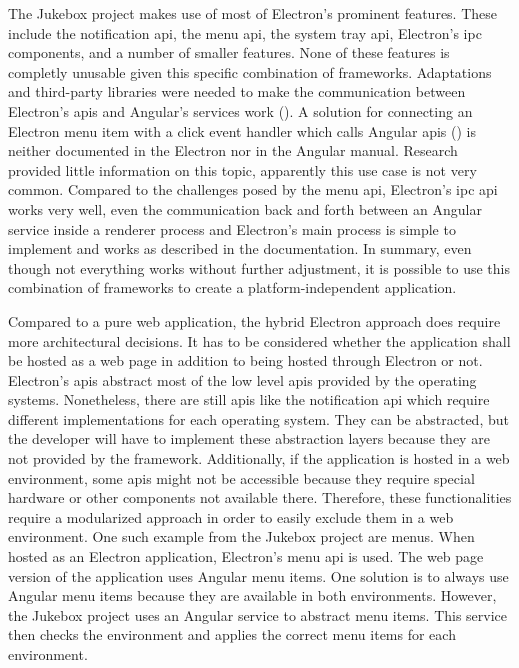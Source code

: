 


The Jukebox project makes use of most of Electron's prominent features. These include the notification \gls{api}, the menu \gls{api}, the system tray \gls{api}, Electron's \gls{ipc} components, and a number of smaller features. None of these features is completly unusable given this specific combination of frameworks. Adaptations and third-party libraries were needed to make the communication between Electron's \glspl{api} and Angular's services work (). A solution for connecting an Electron menu item with a click event handler which calls Angular \glspl{api} () is neither documented in the Electron nor in the Angular manual. Research provided little information on this topic, apparently this use case is not very common. Compared to the challenges posed by the menu \gls{api}, Electron's \gls{ipc} \gls{api} works very well, even the communication back and forth between an Angular service inside a renderer process and Electron's main process is simple to implement and works as described in the documentation. In summary, even though not everything works without further adjustment, it is possible to use this combination of frameworks to create a platform-independent application.


Compared to a pure web application, the hybrid Electron approach does require more architectural decisions. It has to be considered whether the application shall be hosted as a web page in addition to being hosted through Electron or not. Electron's \glspl{api} abstract most of the low level \glspl{api} provided by the operating systems. Nonetheless, there are still \glspl{api} like the notification \gls{api} which require different implementations for each operating system. They can be abstracted, but the developer will have to implement these abstraction layers because they are not provided by the framework. Additionally, if the application is hosted in a web environment, some \glspl{api} might not be accessible because they require special hardware or other components not available there. Therefore, these functionalities require a modularized approach in order to easily exclude them in a web environment. One such example from the Jukebox project are menus. When hosted as an Electron application, Electron's menu \gls{api} is used. The web page version of the application uses Angular menu items. One solution is to always use Angular menu items because they are available in both environments. However, the Jukebox project uses an Angular service to abstract menu items. This service then checks the environment and applies the correct menu items for each environment.

